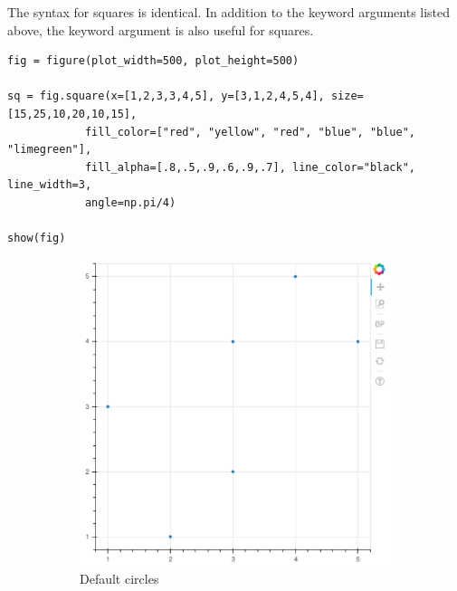 The syntax for squares is identical. In addition to the keyword arguments listed
above, the  keyword argument is also useful for squares.

\begin{lstlisting}
fig = figure(plot_width=500, plot_height=500)

sq = fig.square(x=[1,2,3,3,4,5], y=[3,1,2,4,5,4], size=[15,25,10,20,10,15],
            fill_color=["red", "yellow", "red", "blue", "blue", "limegreen"],
            fill_alpha=[.8,.5,.9,.6,.9,.7], line_color="black", line_width=3,
            angle=np.pi/4)

show(fig)
\end{lstlisting}

\begin{figure}
    \begin{subfigure}{.33\textwidth}
        \centering
            \includegraphics[width=.9\linewidth]{BokehFigs/circles.pdf}
            \caption{Default circles}
            \label{fig:circles}
    \end{subfigure}%
    \begin{subfigure}{.33\textwidth}
        \centering

\end{subfigure}
\end{figure}
